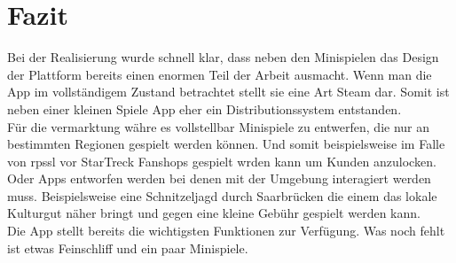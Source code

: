 \chapter{Fazit}
Bei der Realisierung wurde schnell klar, dass neben den Minispielen das Design der Plattform bereits einen enormen Teil der Arbeit ausmacht. Wenn man die App im vollständigem Zustand betrachtet stellt sie eine Art Steam dar. Somit ist neben einer kleinen Spiele App eher ein Distributionssystem entstanden.\\
Für die vermarktung währe es vollstellbar Minispiele zu entwerfen, die nur an bestimmten Regionen gespielt werden können. Und somit beispielsweise im Falle von \gls{rpssl} vor StarTreck Fanshops gespielt wrden kann um Kunden anzulocken.\\
Oder Apps entworfen werden bei denen mit der Umgebung interagiert werden muss. Beispielsweise eine Schnitzeljagd durch Saarbrücken die einem das lokale Kulturgut näher bringt und gegen eine kleine Gebühr gespielt werden kann.\\
Die App stellt bereits die wichtigsten Funktionen zur Verfügung. Was noch fehlt ist etwas Feinschliff und ein paar Minispiele.